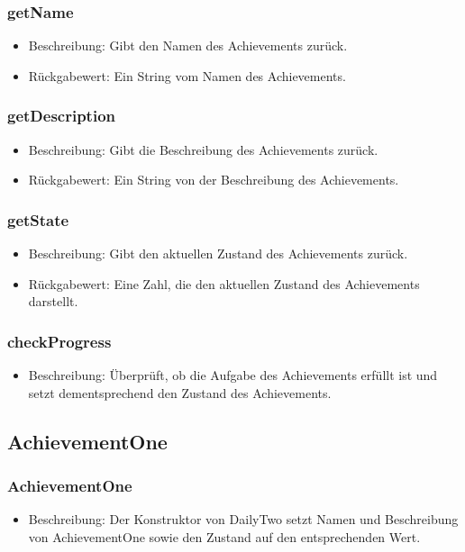 \documentclass[a4paper]{scrreprt}
\begin{document}
   \subsubsection{getName}
   \begin{itemize}
   \item Beschreibung: Gibt den Namen des Achievements zurück.
   \item Rückgabewert: Ein String vom Namen des Achievements.
\end{itemize}
   \subsubsection{getDescription}
   \begin{itemize}
   \item Beschreibung: Gibt die Beschreibung des Achievements zurück.
   \item Rückgabewert: Ein String von der Beschreibung des Achievements.
\end{itemize}
   \subsubsection{getState}
   \begin{itemize}
   	\item Beschreibung: Gibt den aktuellen Zustand des Achievements zurück.
   	\item Rückgabewert: Eine Zahl, die den aktuellen Zustand des Achievements darstellt.
   \end{itemize}
   \subsubsection{checkProgress}
   \begin{itemize}
   \item Beschreibung: Überprüft, ob die Aufgabe des Achievements erfüllt ist und setzt dementsprechend den Zustand des Achievements.
\end{itemize}
   
   \subsection{AchievementOne}
   \subsubsection{AchievementOne}
   \begin{itemize}
   	\item Beschreibung: Der Konstruktor von DailyTwo setzt Namen und Beschreibung von AchievementOne sowie den Zustand auf den entsprechenden Wert.
   \end{itemize}
\end{document}
